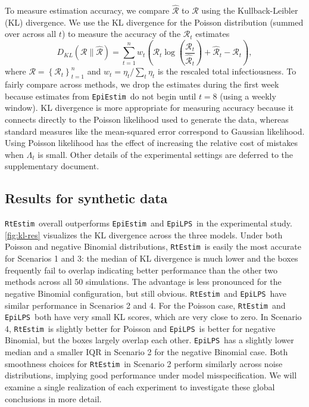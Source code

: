 \documentclass[10pt,letterpaper]{article}
\newcommand{\lr}[1]{\left(#1\right)}
\def\RtEstim{\texttt{RtEstim}}
\def\EpiEstim{\texttt{EpiEstim}}
\def\EpiLPS{\texttt{EpiLPS}}
\def\calR{\mathcal{R}}
\begin{document}
To measure estimation accuracy, we compare $\widehat{\calR}$ to $\calR$ using
the Kullback-Leibler (KL) divergence. We use the KL divergence for the
Poisson distribution (summed over across all $t$) to measure the accuracy
of the $\calR_t$ estimates 
\begin{equation}
  D_{KL}(\calR \parallel \widehat{\calR}) = \sum_{t=1}^n w_t \lr{\calR_t
  \log\left(\frac{\calR_t} {\widehat{\calR}_t}\right) + \widehat{\calR}_t -
{\calR}_t},
\end{equation}
where $\calR = \left\{ \calR_t \right\}_{t=1}^n$ and $w_t = \eta_t
/ \sum_t \eta_t$ is the rescaled total infectiousness. To fairly compare across
methods, we drop the estimates during the first week because estimates from
\EpiEstim\ do not begin until $t=8$ (using a weekly window). KL divergence is
more appropriate for measuring accuracy because it connects directly to the
Poisson likelihood used to generate the data, whereas standard measures like the
mean-squared error correspond to Gaussian likelihood. Using Poisson likelihood
has the effect of increasing the relative cost of mistakes when $\Lambda_t$ is
small. Other details of the experimental settings are deferred to the 
supplementary document. 


\subsection{Results for synthetic data}

\RtEstim\ overall outperforms \EpiEstim\ and \EpiLPS\ in the experimental study.
\autoref{fig:kl-res} visualizes the KL divergence across the three models. Under
both Poisson and negative Binomial distributions, \RtEstim\ is easily the most
accurate for Scenarios 1 and 3: the median of KL divergence is much lower and
the boxes frequently fail to overlap indicating better performance than the
other two methods across all 50 simulations. The advantage is less pronounced
for the negative Binomial configuration, but still obvious.
\RtEstim\ and \EpiLPS\ have similar performance in Scenarios 2 and 4. For the
Poisson case, \RtEstim\ and \EpiLPS\ both have very small KL scores, which are
very close to zero. In Scenario 4, \RtEstim\ is slightly better for Poisson and
\EpiLPS\ is better for negative Binomial, but the boxes largely overlap each
other. \EpiLPS\ has a slightly lower median and a smaller IQR in Scenario 2 for
the negative Binomial case. Both smoothness choices for \RtEstim\ in Scenario 2
perform similarly across noise distributions, implying good performance under 
model misspecification. We will examine a single realization of each
experiment to investigate these global conclusions in more detail.
\end{document}

